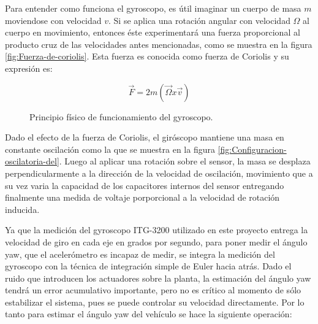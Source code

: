 \documentclass[../main.tex]{subfiles}
\begin{document}
Para entender como funciona el gyroscopo, es útil imaginar un cuerpo
de masa $m$ moviendose con velocidad $v$. Si se aplica una rotación
angular con velocidad $\Omega$ al cuerpo en movimiento, entonces
éste experimentará una fuerza proporcional al producto cruz de las
velocidades antes mencionadas, como se muestra en la figura \ref{fig:Fuerza-de-coriolis}.
Esta fuerza es conocida como fuerza de Coriolis y su expresión es: 

\begin{equation}
\overrightarrow{F}=2m(\overrightarrow{\Omega}x\overrightarrow{v})
\end{equation}


\begin{figure}[H]
\noindent \begin{centering}
\par\end{centering}
\caption{Principio físico de funcionamiento del gyroscopo.}
\end{figure}

Dado el efecto de la fuerza de Coriolis, el giróscopo mantiene una
masa en constante oscilación como la que se muestra en la figura \ref{fig:Configuracion-oscilatoria-del}.
Luego al aplicar una rotación sobre el sensor, la masa se desplaza
perpendicularmente a la dirección de la velocidad de oscilación, movimiento
que a su vez varia la capacidad de los capacitores internos del sensor
entregando finalmente una medida de voltaje porporcional a la velocidad
de rotación inducida.

Ya que la medición del gyroscopo ITG-3200 utilizado en este proyecto
entrega la velocidad de giro en cada eje en grados por segundo, para
poner medir el ángulo yaw, que el acelerómetro es incapaz de medir, se
integra la medición del gyroscopo con la técnica de integración simple
de Euler hacia atrás. Dado el ruido que introducen los actuadores
sobre la planta, la estimación del ángulo yaw tendrá un error acumulativo
importante, pero no es crítico al momento de sólo estabilizar el sistema,
pues se puede controlar su velocidad directamente. Por lo tanto para
estimar el ángulo yaw del vehículo se hace la siguiente operación:
\end{document}
